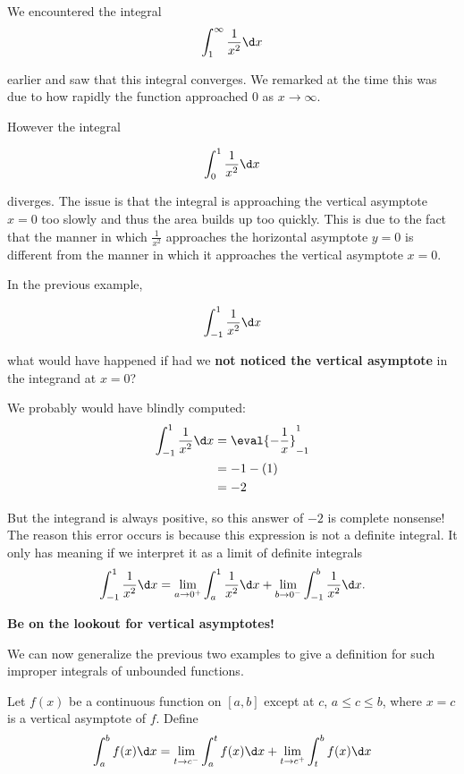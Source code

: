 \documentclass{ximera}
\begin{document}
\begin{remark}
We encountered the integral
\[
\int_{1}^{\infty} \frac{1}{x^{2}} \d x 
\]

earlier and saw that this integral converges. We remarked at the time this was due to how rapidly the function approached $0$ as $x \to \infty$. 

However the integral

\[
\int_{0}^{1} \frac{1}{x^{2}} \d x 
\]

diverges. The issue is that the integral is approaching the vertical asymptote $x=0$ too slowly and thus the area builds up too quickly. This is due to the fact that the manner in which $\frac{1}{x^{2}}$ approaches the horizontal asymptote $y=0$ is different from the manner in which 
it approaches the vertical asymptote $x=0$. 
\end{remark}


\begin{warning}
In the previous example,

\[
\int_{-1}^{1} \frac{1}{x^{2}} \d x
\]

 what would have happened if had we \textbf{not
  noticed the vertical asymptote} in the integrand at $x=0$?

We probably would have blindly computed:
\begin{align*}
  \int_{-1}^1\frac1{x^2}\d x &= \eval{-\frac{1}{x}}_{-1}^1\\
  &= -1 - (1)\\
  &=-2
\end{align*}

But the integrand is always positive, so this answer of $-2$ is
complete nonsense! The reason this error occurs is because this expression is not a definite integral. It only has meaning if we
interpret it as a limit of definite integrals 
\[
 \int_{-1}^1 \frac{1}{x^{2}} \d x = \lim_{a \to 0^+} \int_{a}^1 \frac{1}{x^2} \d x  + \lim_{b \to 0^-} \int_{-1}^{b} \frac{1}{x^2} \d x.
\]


\textbf{Be on the lookout for vertical asymptotes!}
\end{warning}


We can now generalize the previous two examples to give a definition for such 
improper integrals of unbounded functions.

\begin{definition}
Let $f(x)$ be a continuous function on $[a,b]$ except at $c$, $a\leq
c\leq b$, where $x=c$ is a vertical asymptote of $f$. Define
\[
\int_a^b f(x)\d x = \lim_{t\to c^-}\int_a^t f(x)\d x + \lim_{t\to c^+}\int_t^b f(x)\d x
\]
\end{definition}
\end{document}
